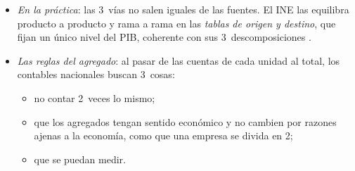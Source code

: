 \documentclass[11pt]{article}
\begin{document}
\begin{itemize}
\begin{itemize}
  \item $G$ es el gasto en consumo final de las Administraciones Públicas; la inversión pública va en $I$;
  \item $X$ y $M$ son las exportaciones y las importaciones de bienes y servicios.
  \end{itemize}
\item \emph{En la práctica}: las 3~vías no salen iguales de las fuentes. El INE las equilibra producto a producto y rama a rama en las \emph{tablas de origen y destino}, que fijan un único nivel del PIB, coherente con sus 3~descomposiciones\nocite{SEC2010} .
\item \emph{Las reglas del agregado}: al pasar de las cuentas de cada unidad al total, los contables nacionales buscan 3~cosas\nocite{LequillerBlades2018}:
  \begin{itemize}
  \item no contar 2~veces lo mismo;
  \item que los agregados tengan sentido económico y no cambien por razones ajenas a la economía, como que una empresa se divida en 2;
  \item que se puedan medir.
  \end{itemize}
\end{itemize}
\end{document}
